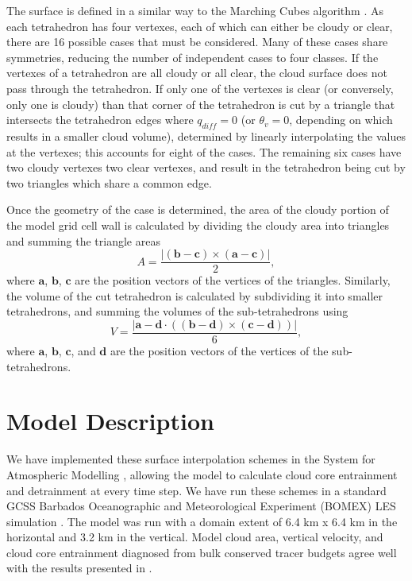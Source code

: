 \documentclass[12pt]{article}
\begin{document}
The surface is defined in a similar way to the Marching Cubes algorithm 
\citep{Lorensen1987}.  As each tetrahedron has four vertexes, each of which can
either be cloudy or clear, there are 16 possible cases that must be considered. 
Many of these cases share symmetries, reducing the number of independent cases 
to four classes.  If the vertexes of a tetrahedron are all cloudy or all clear, 
the cloud surface does not pass through the tetrahedron.  If only one of the 
vertexes is clear (or conversely, only one is cloudy) than that corner of the 
tetrahedron is cut by a triangle that intersects the tetrahedron edges where 
$q_{diff}=0$ (or $\theta_v = 0$, depending on which results in a smaller cloud 
volume), determined by linearly interpolating the values at the vertexes; this 
accounts for eight of the cases.  The remaining six cases have two cloudy 
vertexes two clear vertexes, and result in the tetrahedron being cut by two 
triangles which share a common edge.

Once the geometry of the case is determined, the area of the cloudy portion of
the model grid cell wall is calculated by dividing the cloudy area into 
triangles and summing the triangle areas
\begin{equation}
A = \frac{|(\mathbf{b - c}) \times (\mathbf{a - c})|}{2},
\end{equation}
where $\mathbf{a}$, $\mathbf{b}$, $\mathbf{c}$ are the position vectors of the 
vertices of the triangles.  Similarly, the volume of the cut tetrahedron is 
calculated by subdividing it into smaller tetrahedrons, and summing the volumes 
of the sub-tetrahedrons using
\begin{equation}
V = \frac{|\mathbf{a - d} \cdot ((\mathbf{b - d}) \times (\mathbf{c - d}))|}{6},
\end{equation}
where $\mathbf{a}$, $\mathbf{b}$, $\mathbf{c}$, and $\mathbf{d}$ are the 
position vectors of the vertices of the sub-tetrahedrons.


\section{Model Description}

We have implemented these surface interpolation schemes in the System for 
Atmospheric Modelling \citep[SAM;][]{Khairoutdinov2003}, allowing the model to 
calculate cloud core entrainment and detrainment at every time step.  We have 
run these schemes in a standard GCSS Barbados Oceanographic and Meteorological 
Experiment (BOMEX) LES simulation \citep{Holland1973, Siebesma2003}.  
The model was run with a domain extent of 6.4 km x 6.4 km in the horizontal and 
3.2 km in the vertical.  Model cloud area, vertical velocity, and cloud core 
entrainment diagnosed from bulk conserved tracer budgets agree well with the 
results presented in \cite{Siebesma2003}.
\end{document}
